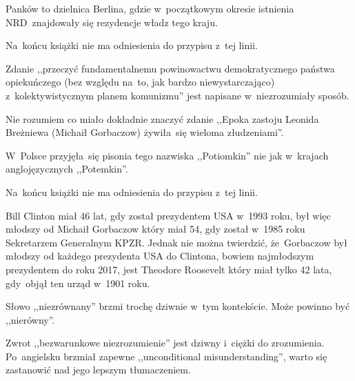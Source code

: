 \documentclass[a4paper,11pt]{article}
\begin{document}
\vspace{\spaceFour}


\start {} Panków to dzielnica Berlina, gdzie
w~początkowym okresie istnienia NRD~znajdowały się rezydencje władz
tego kraju.

\vspace{\spaceFour}


\start {} Na~końcu książki nie ma odniesienia do przypisu
z~tej linii.

\vspace{\spaceFour}


\start {} Zdanie ,,przeczyć fundamentalnemu
powinowactwu demokratycznego państwa opiekuńczego (bez względu na~to,
jak bardzo niewystarczająco) z~kolektywistycznym planem komunizmu''
jest napisane w~niezrozumiały sposób.

\vspace{\spaceFour}


\start {} Nie rozumiem co miało dokładnie znaczyć
zdanie ,,Epoka zastoju Leonida Breżniewa (Michaił Gorbaczow)
żywiła~się wieloma złudzeniami''.

\vspace{\spaceFour}

\start {} W~Polsce przyjęła~się pisonia tego nazwiska
,,Potiomkin'' nie jak w~krajach anglojęzycznych ,,Potemkin''.

\vspace{\spaceFour}


\start {} Na~końcu książki nie ma odniesienia do przypisu
z~tej linii.

\vspace{\spaceFour}


\start {} Bill Clinton miał 46 lat, gdy został prezydentem USA
w~1993 roku, był więc młodszy od Michaił Gorbaczow który miał 54, gdy
został w~1985 roku Sekretarzem Generalnym KPZR. Jednak nie można
twierdzić, że~Gorbaczow był młodszy od każdego prezydenta USA do
Clintona, bowiem najmłodszym prezydentem do roku 2017, jest Theodore
Roosevelt który miał tylko 42 lata, gdy~objął ten urząd w~1901 roku.

\vspace{\spaceFour}


\start {} Słowo ,,niezrównany'' brzmi trochę dziwnie
w~tym kontekście. Może powinno być ,,nierówny''.

\vspace{\spaceFour}


\start {} Zwrot ,,bezwarunkowe niezrozumienie'' jest
dziwny i~ciężki do zrozumienia. Po~angielsku brzmiał zapewne
,,unconditional misunderstanding'', warto się zastanowić nad jego
lepszym tłumaczeniem.
\end{document}
